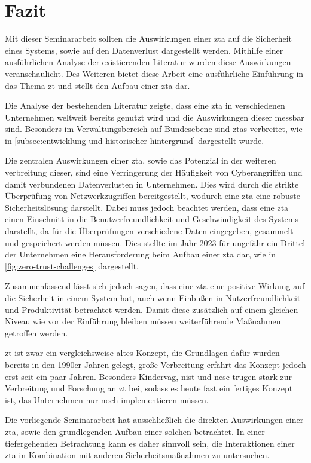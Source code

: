 \newpage
\section{Fazit}\label{sec:fazit}

Mit dieser Seminararbeit sollten die Auswirkungen einer \ac{zta} auf die Sicherheit eines Systems, sowie auf den Datenverlust dargestellt werden.
Mithilfe einer ausführlichen Analyse der existierenden Literatur wurden diese Auswirkungen veranschaulicht.
Des Weiteren bietet diese Arbeit eine ausführliche Einführung in das Thema \ac{zt} und stellt den Aufbau einer \ac{zta} dar.

Die Analyse der bestehenden Literatur zeigte, dass eine \ac{zta} in verschiedenen Unternehmen weltweit bereits genutzt wird und die Auswirkungen dieser messbar sind.
Besonders im Verwaltungsbereich auf Bundesebene sind \acp{zta} verbreitet, wie in \autoref{subsec:entwicklung-und-historischer-hintergrund} dargestellt wurde.

Die zentralen Auswirkungen einer \ac{zta}, sowie das Potenzial in der weiteren verbreitung dieser, sind eine Verringerung der Häufigkeit von Cyberangriffen und damit verbundenen Datenverlusten in Unternehmen.
Dies wird durch die strikte Überprüfung von Netzwerkzugriffen bereitgestellt, wodurch eine \ac{zta} eine robuste Sicherheitslösung darstellt.
Dabei muss jedoch beachtet werden, dass eine \ac{zta} einen Einschnitt in die Benutzerfreundlichkeit und Geschwindigkeit des Systems darstellt, da für die Überprüfungen verschiedene Daten eingegeben, gesammelt und gespeichert werden müssen.
Dies stellte im Jahr 2023 für ungefähr ein Drittel der Unternehmen eine Herausforderung beim Aufbau einer \ac{zta} dar, wie in \autoref{fig:zero-trust-challenges} dargestellt.

Zusammenfassend lässt sich jedoch sagen, dass eine \ac{zta} eine positive Wirkung auf die Sicherheit in einem System hat, auch wenn Einbußen in Nutzerfreundlichkeit und Produktivität betrachtet werden.
Damit diese zusätzlich auf einem gleichen Niveau wie vor der Einführung bleiben müssen weiterführende Maßnahmen getroffen werden.

\ac{zt} ist zwar ein vergleichsweise altes Konzept, die Grundlagen dafür wurden bereits in den 1990er Jahren gelegt, große Verbreitung erfährt das Konzept jedoch erst seit ein paar Jahren.
Besonders Kindervag, \ac{nist} und \ac{ncsc} trugen stark zur Verbreitung und Forschung an \ac{zt} bei, sodass es heute fast ein fertiges Konzept ist, das Unternehmen nur noch implementieren müssen.\autocites{kindervag-2010}{NIST:800207}{ncsc-2021}

Die vorliegende Seminararbeit hat ausschließlich die direkten Auswirkungen einer \ac{zta}, sowie den grundlegenden Aufbau einer solchen betrachtet.
In einer tiefergehenden Betrachtung kann es daher sinnvoll sein, die Interaktionen einer \ac{zta} in Kombination mit anderen Sicherheitsmaßnahmen zu untersuchen.